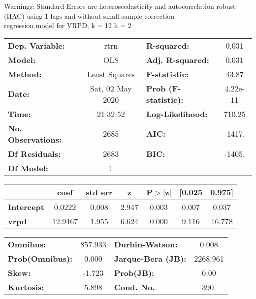 Warnings: \newline
 [1] Standard Errors are heteroscedasticity and autocorrelation robust (HAC) using 1 lags and without small sample correction\\ 

regression model for VRPD, k = 12 h = 2\begin{center}
\begin{tabular}{lclc}
\toprule
\textbf{Dep. Variable:}    &       rtrn       & \textbf{  R-squared:         } &     0.031   \\
\textbf{Model:}            &       OLS        & \textbf{  Adj. R-squared:    } &     0.031   \\
\textbf{Method:}           &  Least Squares   & \textbf{  F-statistic:       } &     43.87   \\
\textbf{Date:}             & Sat, 02 May 2020 & \textbf{  Prob (F-statistic):} &  4.22e-11   \\
\textbf{Time:}             &     21:32:52     & \textbf{  Log-Likelihood:    } &    710.25   \\
\textbf{No. Observations:} &        2685      & \textbf{  AIC:               } &    -1417.   \\
\textbf{Df Residuals:}     &        2683      & \textbf{  BIC:               } &    -1405.   \\
\textbf{Df Model:}         &           1      & \textbf{                     } &             \\
\bottomrule
\end{tabular}
\begin{tabular}{lcccccc}
                   & \textbf{coef} & \textbf{std err} & \textbf{z} & \textbf{P$> |$z$|$} & \textbf{[0.025} & \textbf{0.975]}  \\
\midrule
\textbf{Intercept} &       0.0222  &        0.008     &     2.947  &         0.003        &        0.007    &        0.037     \\
\textbf{vrpd}      &      12.9467  &        1.955     &     6.624  &         0.000        &        9.116    &       16.778     \\
\bottomrule
\end{tabular}
\begin{tabular}{lclc}
\textbf{Omnibus:}       & 857.933 & \textbf{  Durbin-Watson:     } &    0.008  \\
\textbf{Prob(Omnibus):} &   0.000 & \textbf{  Jarque-Bera (JB):  } & 2268.961  \\
\textbf{Skew:}          &  -1.723 & \textbf{  Prob(JB):          } &     0.00  \\
\textbf{Kurtosis:}      &   5.898 & \textbf{  Cond. No.          } &     390.  \\
\bottomrule
\end{tabular}
\end{center}

